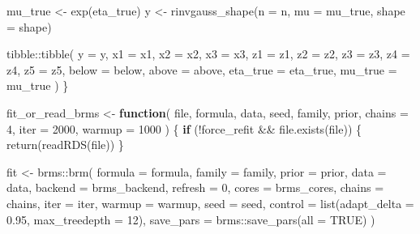\documentclass[
  english,
  letterpaper,
  DIV=11,
  numbers=noendperiod]{scrartcl}
\newenvironment{Shaded}{\begin{snugshade}}{\end{snugshade}}
\newcommand{\AttributeTok}[1]{\textcolor[rgb]{0.40,0.45,0.13}{#1}}
\newcommand{\ConstantTok}[1]{\textcolor[rgb]{0.56,0.35,0.01}{#1}}
\newcommand{\ControlFlowTok}[1]{\textcolor[rgb]{0.00,0.23,0.31}{\textbf{#1}}}
\newcommand{\DecValTok}[1]{\textcolor[rgb]{0.68,0.00,0.00}{#1}}
\newcommand{\FloatTok}[1]{\textcolor[rgb]{0.68,0.00,0.00}{#1}}
\newcommand{\FunctionTok}[1]{\textcolor[rgb]{0.28,0.35,0.67}{#1}}
\newcommand{\NormalTok}[1]{\textcolor[rgb]{0.00,0.23,0.31}{#1}}
\newcommand{\OtherTok}[1]{\textcolor[rgb]{0.00,0.23,0.31}{#1}}
\newcommand{\SpecialCharTok}[1]{\textcolor[rgb]{0.37,0.37,0.37}{#1}}
\begin{document}
\begin{Shaded}
\begin{Highlighting}[]
\NormalTok{  mu\_true }\OtherTok{\textless{}{-}} \FunctionTok{exp}\NormalTok{(eta\_true)}
\NormalTok{  y }\OtherTok{\textless{}{-}} \FunctionTok{rinvgauss\_shape}\NormalTok{(}\AttributeTok{n =}\NormalTok{ n, }\AttributeTok{mu =}\NormalTok{ mu\_true, }\AttributeTok{shape =}\NormalTok{ shape)}

\NormalTok{  tibble}\SpecialCharTok{::}\FunctionTok{tibble}\NormalTok{(}
    \AttributeTok{y =}\NormalTok{ y,}
    \AttributeTok{x1 =}\NormalTok{ x1,}
    \AttributeTok{x2 =}\NormalTok{ x2,}
    \AttributeTok{x3 =}\NormalTok{ x3,}
    \AttributeTok{z1 =}\NormalTok{ z1,}
    \AttributeTok{z2 =}\NormalTok{ z2,}
    \AttributeTok{z3 =}\NormalTok{ z3,}
    \AttributeTok{z4 =}\NormalTok{ z4,}
    \AttributeTok{z5 =}\NormalTok{ z5,}
    \AttributeTok{below =}\NormalTok{ below,}
    \AttributeTok{above =}\NormalTok{ above,}
    \AttributeTok{eta\_true =}\NormalTok{ eta\_true,}
    \AttributeTok{mu\_true =}\NormalTok{ mu\_true}
\NormalTok{  )}
\NormalTok{\}}

\NormalTok{fit\_or\_read\_brms }\OtherTok{\textless{}{-}} \ControlFlowTok{function}\NormalTok{(}
\NormalTok{  file,}
\NormalTok{  formula,}
\NormalTok{  data,}
\NormalTok{  seed,}
\NormalTok{  family,}
\NormalTok{  prior,}
  \AttributeTok{chains =} \DecValTok{4}\NormalTok{,}
  \AttributeTok{iter =} \DecValTok{2000}\NormalTok{,}
  \AttributeTok{warmup =} \DecValTok{1000}
\NormalTok{) \{}
  \ControlFlowTok{if}\NormalTok{ (}\SpecialCharTok{!}\NormalTok{force\_refit }\SpecialCharTok{\&\&} \FunctionTok{file.exists}\NormalTok{(file)) \{}
    \FunctionTok{return}\NormalTok{(}\FunctionTok{readRDS}\NormalTok{(file))}
\NormalTok{  \}}

\NormalTok{  fit }\OtherTok{\textless{}{-}}\NormalTok{ brms}\SpecialCharTok{::}\FunctionTok{brm}\NormalTok{(}
    \AttributeTok{formula =}\NormalTok{ formula,}
    \AttributeTok{family =}\NormalTok{ family,}
    \AttributeTok{prior =}\NormalTok{ prior,}
    \AttributeTok{data =}\NormalTok{ data,}
    \AttributeTok{backend =}\NormalTok{ brms\_backend,}
    \AttributeTok{refresh =} \DecValTok{0}\NormalTok{,}
    \AttributeTok{cores =}\NormalTok{ brms\_cores,}
    \AttributeTok{chains =}\NormalTok{ chains,}
    \AttributeTok{iter =}\NormalTok{ iter,}
    \AttributeTok{warmup =}\NormalTok{ warmup,}
    \AttributeTok{seed =}\NormalTok{ seed,}
    \AttributeTok{control =} \FunctionTok{list}\NormalTok{(}\AttributeTok{adapt\_delta =} \FloatTok{0.95}\NormalTok{, }\AttributeTok{max\_treedepth =} \DecValTok{12}\NormalTok{),}
    \AttributeTok{save\_pars =}\NormalTok{ brms}\SpecialCharTok{::}\FunctionTok{save\_pars}\NormalTok{(}\AttributeTok{all =} \ConstantTok{TRUE}\NormalTok{)}
\NormalTok{  )}


\end{Highlighting}
\end{Shaded}
\end{document}
